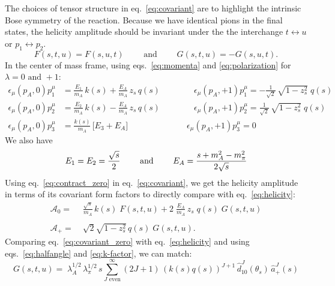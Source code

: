 \documentclass[aps,prd,amsmath,amssymb,superscriptaddress,onecolumn,
nofootinbib,showpacs,preprintnumbers]{revtex4-1}
\begin{document}
The choices of tensor structure in eq.~\ref{eq:covariant} are to highlight the intrinsic Bose symmetry of the reaction. Because we have identical pions in the final states, the helicity amplitude should be invariant under the the interchange \(t \leftrightarrow u \) or \(p_1 \leftrightarrow p_2\).
  \begin{equation}
    F(s,t,u) = F(s,u,t) \qquad \text{ and } \qquad G(s,t,u) = - G(s,u,t).
  \end{equation}
In the center of mass frame, using eqs.~\ref{eq:momenta} and \ref{eq:polarization} for \(\lambda = 0 \text{ and } +1 \):
  \begin{align}
    \label{eq:contract_zero}
    \epsilon_\mu(p_A,0) p_1^\mu &= \frac{E_1}{m_A} \, k(s) + \frac{E_A}{m_A} \,  z_s \, q(s)
    \qquad \qquad \epsilon_\mu(p_A,+1) p_1^\mu = - \frac{1}{\sqrt{2}} \, \sqrt{1 - z_s^2} \; q(s) \nonumber \\
    \epsilon_\mu(p_A,0) p_2^\mu &= \frac{E_2}{m_A} \, k(s) - \frac{E_A}{m_A} \,  z_s \, q(s)
    \qquad \qquad \epsilon_\mu(p_A,+1) p_2^\mu =  \frac{1}{\sqrt{2}} \, \sqrt{1 - z_s^2} \; q(s)  \\
    \epsilon_\mu(p_A,0) p_3^\mu &= \frac{k(s)}{m_A} \, \big[E_3 + E_A \big]
    \qquad \qquad \qquad \quad \epsilon_\mu(p_A,+1) p_3^\mu = 0 \nonumber
  \end{align}
We also have
  \begin{equation}
    \label{eq:energies}
    E_1 = E_2 = \frac{\sqrt{s}}{2} \qquad \text{ and } \qquad E_A = \frac{s + m_A^2 - m_\pi^2}{2 \sqrt{s}}
  \end{equation}
Using eq.~\ref{eq:contract_zero} in eq.~\ref{eq:covariant}, we get the helicity amplitude in terms of its covariant form factors to directly compare with eq.~\ref{eq:helicity}:
 \begin{align}
  \label{eq:covariant_zero}
   \mathcal{A}_0 =& \; \frac{\sqrt{s}}{m_A} \, k(s) \; F(s,t,u) + 2 \; \frac{E_A}{m_A} \, z_s \; q(s) \; G(s,t,u) \\
   \nonumber \\
   \label{eq:covariant_plus}
   \mathcal{A}_+ =& \; \sqrt{2} \sqrt{1-z_s^2} \, q(s) \; G(s,t,u).
 \end{align}
Comparing eq.~\ref{eq:covariant_zero} with eq.~\ref{eq:helicity} and using eqs.~\ref{eq:halfangle} and \ref{eq:k-factor}, we can match:
  \begin{equation}
    \label{eq:matching_G}
    G(s,t,u) =  \; \lambda_A^{1/2}  \, \lambda_\pi^{1/2}  \, s \sum_{J \text{ even}}^\infty (2J+1) \, (k(s)q(s))^{J+1} \,\hat{d}^J_{10}(\theta_s) \, \hat{a}^J_+(s)
  \end{equation}
\end{document}
